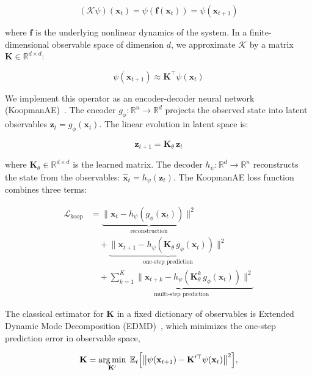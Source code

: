 \documentclass[preprint,12pt,times,numbers]{elsarticle}
\begin{document}
\begin{equation}
(\mathcal{K} \psi)(\mathbf{x}_t) = \psi(\mathbf{f}(\mathbf{x}_t)) = \psi(\mathbf{x}_{t+1})
\label{eq:koopman_def}
\end{equation}

where $\mathbf{f}$ is the underlying nonlinear dynamics of the system. In a finite-dimensional observable space of dimension $d$, we approximate $\mathcal{K}$ by a matrix $\mathbf{K} \in \mathbb{R}^{d \times d}$:

\begin{equation}
\psi(\mathbf{x}_{t+1}) \approx \mathbf{K}^\top \psi(\mathbf{x}_t)
\label{eq:koopman_lin}
\end{equation}

We implement this operator as an encoder-decoder neural network (KoopmanAE)~\cite{article:lusch2018,article:takeishi2017}. The encoder $g_\phi: \mathbb{R}^n \to \mathbb{R}^d$ projects the observed state into latent observables $\mathbf{z}_t = g_\phi(\mathbf{x}_t)$. The linear evolution in latent space is:

\begin{equation}
\mathbf{z}_{t+1} = \mathbf{K}_\theta \, \mathbf{z}_t
\label{eq:latent_evolution}
\end{equation}

where $\mathbf{K}_\theta \in \mathbb{R}^{d \times d}$ is the learned matrix. The decoder $h_\psi: \mathbb{R}^d \to \mathbb{R}^n$ reconstructs the state from the observables: $\hat{\mathbf{x}}_t = h_\psi(\mathbf{z}_t)$. The KoopmanAE loss function combines three terms:

\begin{align}
\mathcal{L}_{\text{koop}} &= \underbrace{\|\mathbf{x}_t - h_\psi(g_\phi(\mathbf{x}_t))\|^2}_{\text{reconstruction}} \nonumber \\
&\quad + \underbrace{\|\mathbf{x}_{t+1} - h_\psi(\mathbf{K}_\theta \, g_\phi(\mathbf{x}_t))\|^2}_{\text{one-step prediction}} \nonumber \\
&\quad + \underbrace{\sum_{k=1}^{K} \|\mathbf{x}_{t+k} - h_\psi(\mathbf{K}_\theta^k \, g_\phi(\mathbf{x}_t))\|^2}_{\text{multi-step prediction}}
\label{eq:koopman_loss}
\end{align}

The classical estimator for $\mathbf{K}$ in a fixed dictionary of observables is Extended Dynamic Mode Decomposition (EDMD)~\cite{article:williams2015}, which minimizes the one-step prediction error in observable space,

\begin{equation}
\mathbf{K} = \operatorname*{arg\,min}_{\mathbf{K}'} \; \mathbb{E}_{t}\Bigl[ \bigl\| \psi(\mathbf{x}_{t+1}) - \mathbf{K}'^{\top} \psi(\mathbf{x}_t) \bigr\|^2 \Bigr],
\label{eq:edmd_obj}
\end{equation}
\end{document}
